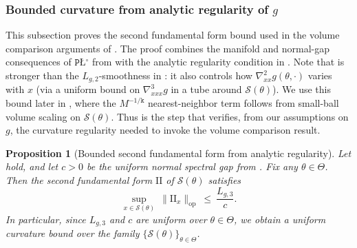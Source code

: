 \documentclass{article}
\theoremstyle{normaltheorem}
\newtheorem{proposition}[proposition]{Proposition}
\newcommand{\PLcirc}{\texttt{P\L$^\circ$}}
\newcommand{\dimk}{\texttt{k}}
\newcommand{\calS}{\mathcal{S}}
\begin{document}
\subsubsection[Bounded curvature from analytic regularity of g]{Bounded curvature from analytic regularity of $g$}\label{append:curvature-from-g}
\noindent
This subsection proves the second fundamental form bound used in the volume comparison arguments of
\citep[e.g., Lem.~4.1]{masiha2025superquantile}. The proof combines the manifold and normal-gap consequences of
\(\PLcirc\) from  with the analytic regularity condition in .
Note that  is stronger than the $L_{g,2}$-smoothness in :
it also controls how $\nabla^2_{xx}g(\theta,\cdot)$ varies with $x$ (via a uniform bound on $\nabla^3_{xxx}g$ in a tube around $\calS(\theta)$).
We use this bound later in , where the \(M^{-1/\dimk}\) nearest-neighbor term follows from
small-ball volume scaling on \(\calS(\theta)\). Thus  is the step that verifies, from our
assumptions on \(g\), the curvature regularity needed to invoke the volume comparison result.

\begin{proposition}[Bounded second fundamental form from analytic regularity]\label{prop:second-fund-from-g}
Let  hold, and let \(c>0\) be the uniform normal spectral gap from
. Fix any $\theta\in\Theta$. Then the second fundamental form $\mathrm{II}$ of $\calS(\theta)$ satisfies
\[
\sup_{x\in \calS(\theta)}\ \|\mathrm{II}_x\|_{\mathrm{op}}\ \le\ \frac{L_{g,3}}{c}.
\]
In particular, since \(L_{g,3}\) and \(c\) are uniform over \(\theta\in\Theta\), we obtain a uniform curvature bound over the family \(\{\calS(\theta)\}_{\theta\in\Theta}\).
\end{proposition}
\end{document}
